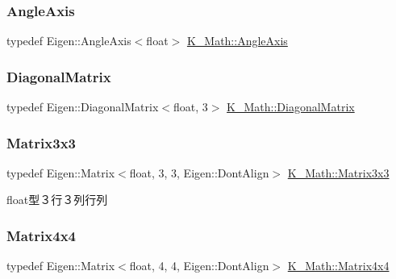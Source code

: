 \subsubsection{\texorpdfstring{Angle\+Axis}{AngleAxis}}
{\footnotesize\ttfamily typedef Eigen\+::\+Angle\+Axis$<$float$>$ \mbox{\hyperlink{namespace_k___math_a0f5db7b05f161215069d86bce9dac011}{K\+\_\+\+Math\+::\+Angle\+Axis}}}

\mbox{\label{namespace_k___math_aff8bcbdc2a06207d456cb31f4d72d861}} 
\subsubsection{\texorpdfstring{Diagonal\+Matrix}{DiagonalMatrix}}
{\footnotesize\ttfamily typedef Eigen\+::\+Diagonal\+Matrix$<$float, 3$>$ \mbox{\hyperlink{namespace_k___math_aff8bcbdc2a06207d456cb31f4d72d861}{K\+\_\+\+Math\+::\+Diagonal\+Matrix}}}

\mbox{\label{namespace_k___math_a560235ba0b8247680dfa595fc7c975dd}} 
\subsubsection{\texorpdfstring{Matrix3x3}{Matrix3x3}}
{\footnotesize\ttfamily typedef Eigen\+::\+Matrix$<$float, 3, 3, Eigen\+::\+Dont\+Align$>$ \mbox{\hyperlink{namespace_k___math_a560235ba0b8247680dfa595fc7c975dd}{K\+\_\+\+Math\+::\+Matrix3x3}}}



float型３行３列行列 

\mbox{\label{namespace_k___math_a345271af9d32dff2c964bc679b13b45c}} 
\subsubsection{\texorpdfstring{Matrix4x4}{Matrix4x4}}
{\footnotesize\ttfamily typedef Eigen\+::\+Matrix$<$float, 4, 4, Eigen\+::\+Dont\+Align$>$ \mbox{\hyperlink{namespace_k___math_a345271af9d32dff2c964bc679b13b45c}{K\+\_\+\+Math\+::\+Matrix4x4}}}



